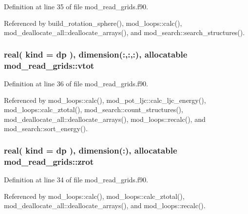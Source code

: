 Definition at line 35 of file mod\+\_\+read\+\_\+grids.\+f90.



Referenced by build\+\_\+rotation\+\_\+sphere(), mod\+\_\+loops\+::calc(), mod\+\_\+deallocate\+\_\+all\+::deallocate\+\_\+arrays(), and mod\+\_\+search\+::search\+\_\+structures().

\subsubsection[{\texorpdfstring{vtot}{vtot}}]{\setlength{\rightskip}{0pt plus 5cm}real( kind = dp ), dimension(\+:,\+:,\+:), allocatable mod\+\_\+read\+\_\+grids\+::vtot}\hypertarget{namespacemod__read__grids_a1acebe9f23427d5bc54629463ab63378}{}\label{namespacemod__read__grids_a1acebe9f23427d5bc54629463ab63378}


Definition at line 36 of file mod\+\_\+read\+\_\+grids.\+f90.



Referenced by mod\+\_\+loops\+::calc(), mod\+\_\+pot\+\_\+ljc\+::calc\+\_\+ljc\+\_\+energy(), mod\+\_\+loops\+::calc\+\_\+ztotal(), mod\+\_\+search\+::count\+\_\+structures(), mod\+\_\+deallocate\+\_\+all\+::deallocate\+\_\+arrays(), mod\+\_\+loops\+::recalc(), and mod\+\_\+search\+::sort\+\_\+energy().

\subsubsection[{\texorpdfstring{zrot}{zrot}}]{\setlength{\rightskip}{0pt plus 5cm}real( kind = dp ), dimension(\+:), allocatable mod\+\_\+read\+\_\+grids\+::zrot}\hypertarget{namespacemod__read__grids_aa1dc0d4a91ccebc952bde4d1f380b174}{}\label{namespacemod__read__grids_aa1dc0d4a91ccebc952bde4d1f380b174}


Definition at line 34 of file mod\+\_\+read\+\_\+grids.\+f90.



Referenced by mod\+\_\+loops\+::calc(), mod\+\_\+loops\+::calc\+\_\+ztotal(), mod\+\_\+deallocate\+\_\+all\+::deallocate\+\_\+arrays(), and mod\+\_\+loops\+::recalc().


